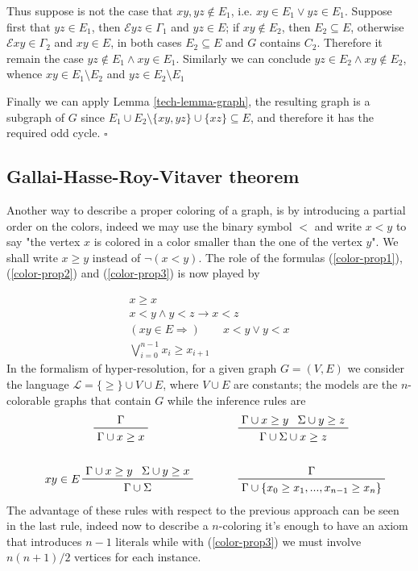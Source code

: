 \documentclass[a4paper,12pt,oneside]{book}
\newcommand{\E}{\mathscr{E}}
\newcommand*{\QED}{\hfill\ensuremath{\square}}
\newcommand*{\QEDn}{\newline\hspace*{1cm}\QED} %
\let\o\vee
\let\e\wedge
\begin{document}
Thus suppose is not the case that $xy,yz \notin E_1$, i.e. $xy \in E_1 \o yz\in E_1 $. Suppose first that $yz\in E_1$, then $\E yz\in\Gamma_1$ and $yz\in E$; if $xy\notin E_2$, then $E_2\subseteq E$, otherwise $\E xy \in \Gamma_2$ and $xy\in E$, in both cases  $E_2\subseteq E$ and $G$ contains $C_2$. Therefore it remain 
the case $yz\notin E_1 \e xy\in E_1$. Similarly we can conclude  $yz\in E_2 \e xy\notin E_2$, whence $xy\in E_1\setminus E_2$ and $yz\in E_2\setminus E_1$

Finally we can apply Lemma  \ref{tech-lemma-graph}, the resulting graph is a subgraph of $G$ since $E_1\cup E_2\setminus\{xy,yz\}\cup\{xz\} \subseteq E $, and therefore it has the required odd cycle. 
\QEDn

\newpage
\subsection*{Gallai-Hasse-Roy-Vitaver theorem}

Another way to describe a proper coloring of a graph, is by introducing a partial order on the colors, indeed we may use the binary symbol $<$ and write $x<y$ to say "the vertex $x$ is colored in a color smaller than the one of the vertex $y$". We shall write $x\geq y $ instead of $\neg (x<y)$. The role of the formulas (\ref{color-prop1}), (\ref{color-prop2}) and (\ref{color-prop3}) is now played by 

\begin{gather}
x\geq x\\
x<y \e y<z \rightarrow x<z \\
( xy \in E \Rightarrow ) \qquad  x<y \o y<x\\
\bigvee_{i=0}^{n-1} x_i\geq x_{i+1}
\end{gather}
In the formalism of hyper-resolution, for a given graph $G=(V,E)$ we consider the language $\mathscr{L}=\{\geq\}\cup V\cup E$, where $V\cup E$ are constants; the models are the $n$-colorable graphs that contain $G$ while the inference rules are
\begin{align*}
\prftree{\Gamma}{\Gamma \cup x\geq x }\qquad \qquad\qquad
& \qquad\prftree{\Gamma\cup x\geq y}{ \Sigma\cup y\geq z }{\Gamma\cup\Sigma\cup x\geq z } \\
\,&\,\\
\prftree[l]{$\quad xy \in E $}{\Gamma \cup  x\geq y }{\Sigma \cup  y\geq x }
{ \Gamma\cup\Sigma} \qquad &\qquad \prftree{\Gamma}
{\Gamma\cup\{x_0\geq x_1 ,..., x_{n-1}\geq x_n \}}
\end{align*}
The advantage of these rules with respect to the previous approach can be seen in the last rule, indeed now to describe a $n$-coloring it's enough to have an axiom that introduces $n-1$ literals while with (\ref{color-prop3}) we must involve $n(n+1)/2$ vertices for each instance.
\end{document}
